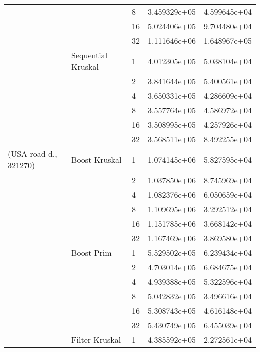 \begin{tabular}{lllrr}
                       &                    & 8  &  3.459329e+05 &  4.599645e+04 \\
                       &                    & 16 &  5.024406e+05 &  9.704480e+04 \\
                       &                    & 32 &  1.111646e+06 &  1.648967e+05 \\
                       & Sequential Kruskal & 1  &  4.012305e+05 &  5.038104e+04 \\
                       &                    & 2  &  3.841644e+05 &  5.400561e+04 \\
                       &                    & 4  &  3.650331e+05 &  4.286609e+04 \\
                       &                    & 8  &  3.557764e+05 &  4.586972e+04 \\
                       &                    & 16 &  3.508995e+05 &  4.257926e+04 \\
                       &                    & 32 &  3.568511e+05 &  8.492255e+04 \\
(USA-road-d., 321270) & Boost Kruskal & 1  &  1.074145e+06 &  5.827595e+04 \\
                       &                    & 2  &  1.037850e+06 &  8.745969e+04 \\
                       &                    & 4  &  1.082376e+06 &  6.050659e+04 \\
                       &                    & 8  &  1.109695e+06 &  3.292512e+04 \\
                       &                    & 16 &  1.151785e+06 &  3.668142e+04 \\
                       &                    & 32 &  1.167469e+06 &  3.869580e+04 \\
                       & Boost Prim & 1  &  5.529502e+05 &  6.239434e+04 \\
                       &                    & 2  &  4.703014e+05 &  6.684675e+04 \\
                       &                    & 4  &  4.939388e+05 &  5.322596e+04 \\
                       &                    & 8  &  5.042832e+05 &  3.496616e+04 \\
                       &                    & 16 &  5.308743e+05 &  4.616148e+04 \\
                       &                    & 32 &  5.430749e+05 &  6.455039e+04 \\
                       & Filter Kruskal & 1  &  4.385592e+05 &  2.272561e+04 \\

\end{tabular}
